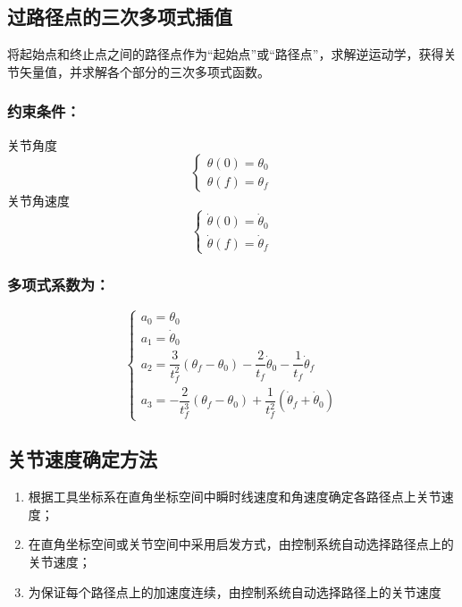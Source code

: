 
\subsection{过路径点的三次多项式插值}
将起始点和终止点之间的路径点作为“起始点”或“路径点”，求解逆运动学，获得关节矢量值，并求解各个部分的三次多项式函数。

\subsubsection{约束条件：}
关节角度
$$
\begin{cases} 
\theta(0) = \theta_0 \\ 
\theta(f) = \theta_f 
\end{cases}
$$
关节角速度
$$
\begin{cases} 
\dot{\theta}(0) = \dot{\theta}_0 \\ 
\dot{\theta}(f) = \dot{\theta}_f
\end{cases}
$$

\subsubsection{多项式系数为：}
$$
\begin{cases} 
a_0 = \theta_0 \\ 
a_1 = \dot{\theta}_0 \\
a_2 = \dfrac{3}{t_f^2}\left(\theta_f-\theta_0\right) - \dfrac{2}{t_f}\dot{\theta}_0  - \dfrac{1}{t_f}\dot{\theta}_f \\
a_3 = -\dfrac{2}{t_f^3}\left(\theta_f-\theta_0\right) + \dfrac{1}{t_f^2}\left(\dot{\theta}_f+\dot{\theta}_0\right)
\end{cases}
$$

\subsection{关节速度确定方法}
\begin{enumerate}
    \item 根据工具坐标系在直角坐标空间中瞬时线速度和角速度确定各路径点上关节速度；
    \item 在直角坐标空间或关节空间中采用启发方式，由控制系统自动选择路径点上的关节速度；
    \item 为保证每个路径点上的加速度连续，由控制系统自动选择路径上的关节速度
\end{enumerate}

